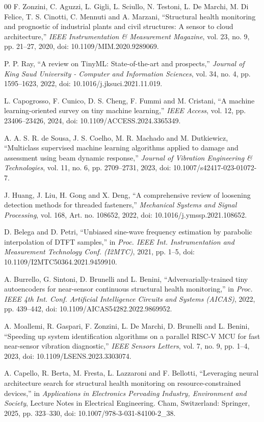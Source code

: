 \documentclass[conference]{IEEEtran}
\begin{document}
\begin{thebibliography}{00}
 F. Zonzini, C. Aguzzi, L. Gigli, L. Sciullo, N. Testoni, L. De Marchi, M. Di Felice, T. S. Cinotti, C. Mennuti and A. Marzani, ``Structural health monitoring and prognostic of industrial plants and civil structures: A sensor to cloud architecture,'' \emph{IEEE Instrumentation \& Measurement Magazine}, vol. 23, no. 9, pp. 21--27, 2020, doi: 10.1109/MIM.2020.9289069.

 P. P. Ray, ``A review on TinyML: State-of-the-art and prospects,'' \emph{Journal of King Saud University - Computer and Information Sciences}, vol. 34, no. 4, pp. 1595--1623, 2022, doi: 10.1016/j.jksuci.2021.11.019.

 L. Capogrosso, F. Cunico, D. S. Cheng, F. Fummi and M. Cristani, ``A machine learning-oriented survey on tiny machine learning,'' \emph{IEEE Access}, vol. 12, pp. 23406--23426, 2024, doi: 10.1109/ACCESS.2024.3365349.

 A. A. S. R. de Sousa, J. S. Coelho, M. R. Machado and M. Dutkiewicz, ``Multiclass supervised machine learning algorithms applied to damage and assessment using beam dynamic response,'' \emph{Journal of Vibration Engineering \& Technologies}, vol. 11, no. 6, pp. 2709--2731, 2023, doi: 10.1007/s42417-023-01072-7.

 J. Huang, J. Liu, H. Gong and X. Deng, ``A comprehensive review of loosening detection methods for threaded fasteners,'' \emph{Mechanical Systems and Signal Processing}, vol. 168, Art. no. 108652, 2022, doi: 10.1016/j.ymssp.2021.108652.

 D. Belega and D. Petri, ``Unbiased sine-wave frequency estimation by parabolic interpolation of DTFT samples,'' in \emph{Proc. IEEE Int. Instrumentation and Measurement Technology Conf. (I2MTC)}, 2021, pp. 1--5, doi: 10.1109/I2MTC50364.2021.9459910.

 A. Burrello, G. Sintoni, D. Brunelli and L. Benini, ``Adversarially-trained tiny autoencoders for near-sensor continuous structural health monitoring,'' in \emph{Proc. IEEE 4th Int. Conf. Artificial Intelligence Circuits and Systems (AICAS)}, 2022, pp. 439--442, doi: 10.1109/AICAS54282.2022.9869952.

 A. Moallemi, R. Gaspari, F. Zonzini, L. De Marchi, D. Brunelli and L. Benini, ``Speeding up system identification algorithms on a parallel RISC-V MCU for fast near-sensor vibration diagnostic,'' \emph{IEEE Sensors Letters}, vol. 7, no. 9, pp. 1--4, 2023, doi: 10.1109/LSENS.2023.3303074.

 A. Capello, R. Berta, M. Fresta, L. Lazzaroni and F. Bellotti, ``Leveraging neural architecture search for structural health monitoring on resource-constrained devices,'' in \emph{Applications in Electronics Pervading Industry, Environment and Society}, Lecture Notes in Electrical Engineering. Cham, Switzerland: Springer, 2025, pp. 323--330, doi: 10.1007/978-3-031-84100-2\_38.
\end{thebibliography}
\end{document}
